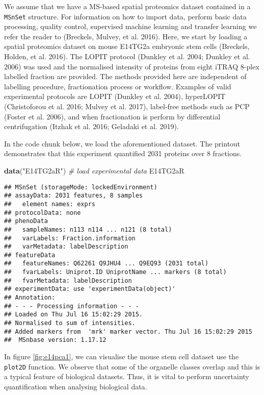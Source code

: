 \documentclass[]{article}
\newenvironment{Shaded}{\begin{snugshade}}{\end{snugshade}}
\newcommand{\KeywordTok}[1]{\textcolor[rgb]{0.13,0.29,0.53}{\textbf{{#1}}}}
\newcommand{\StringTok}[1]{\textcolor[rgb]{0.31,0.60,0.02}{{#1}}}
\newcommand{\CommentTok}[1]{\textcolor[rgb]{0.56,0.35,0.01}{\textit{{#1}}}}
\newcommand{\NormalTok}[1]{{#1}}
\begin{document}
We assume that we have a MS-based spatial proteomics dataset contained
in a \texttt{MSnSet} structure. For information on how to import data,
perform basic data processing, quality control, supervised machine
learning and transfer learning we refer the reader to (Breckels, Mulvey,
et al. 2016). Here, we start by loading a spatial proteomics dataset on
mouse E14TG2a embryonic stem cells (Breckels, Holden, et al. 2016). The
LOPIT protocol (Dunkley et al. 2004; Dunkley et al. 2006) was used and
the normalised intensity of proteins from eight iTRAQ 8-plex labelled
fraction are provided. The methods provided here are independent of
labelling procedure, fractionation process or workflow. Examples of
valid experimental protocols are LOPIT (Dunkley et al. 2004), hyperLOPIT
(Christoforou et al. 2016; Mulvey et al. 2017), label-free methods such
as PCP (Foster et al. 2006), and when fractionation is perform by
differential centrifugation (Itzhak et al. 2016; Geladaki et al. 2019).

In the code chunk below, we load the aforementioned dataset. The
printout demonstrates that this experiment quantified 2031 proteins over
8 fractions.

\begin{Shaded}
\begin{Highlighting}[]
\KeywordTok{data}\NormalTok{(}\StringTok{"E14TG2aR"}\NormalTok{) }\CommentTok{# load experimental data}
\NormalTok{E14TG2aR}
\end{Highlighting}
\end{Shaded}

\begin{verbatim}
## MSnSet (storageMode: lockedEnvironment)
## assayData: 2031 features, 8 samples 
##   element names: exprs 
## protocolData: none
## phenoData
##   sampleNames: n113 n114 ... n121 (8 total)
##   varLabels: Fraction.information
##   varMetadata: labelDescription
## featureData
##   featureNames: Q62261 Q9JHU4 ... Q9EQ93 (2031 total)
##   fvarLabels: Uniprot.ID UniprotName ... markers (8 total)
##   fvarMetadata: labelDescription
## experimentData: use 'experimentData(object)'
## Annotation:  
## - - - Processing information - - -
## Loaded on Thu Jul 16 15:02:29 2015. 
## Normalised to sum of intensities. 
## Added markers from  'mrk' marker vector. Thu Jul 16 15:02:29 2015 
##  MSnbase version: 1.17.12
\end{verbatim}

In figure \ref{fig:e14pca1}, we can visualise the mouse stem cell
dataset use the \texttt{plot2D} function. We observe that some of the
organelle classes overlap and this is a typical feature of biological
datasets. Thus, it is vital to perform uncertainty quantification when
analysing biological data.
\end{document}

